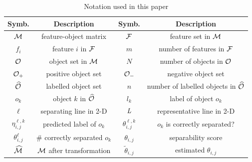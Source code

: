 \begin{table}[t!]
\centering
\small
\begin{tabular}{|c|c|c|c|}
 \hline
 Symb. & Description & Symb. & Description\\
 \hline
 \hline
 ${\mathcal{M}}$ & feature-object matrix & ${\mathcal{F}}$ & feature set in ${\mathcal{M}}$ \\
 \hline
 $f_i$ & feature $i$ in ${\mathcal{F}}$ & $m$ & number of features in ${\mathcal{F}}$\\
 \hline
 ${\mathcal{O}}$ & object set in ${\mathcal{M}}$ & $N$ & number of objects in ${\mathcal{O}}$\\
 \hline
 ${\mathcal{O}}_+$ & positive object set & ${\mathcal{O}}_-$ & negative object set\\
 \hline
 $\widehat{{\mathcal{O}}}$ & labelled object set & $n$ & number of labelled objects in $\widehat{{\mathcal{O}}}$\\
 \hline
 $o_k$ & object $k$ in $\widehat{{\mathcal{O}}}$ & $l_k$ & label of object $o_k$\\
 \hline
 $\ell$ & separating line in 2-D & $\mathit{L}$ & representative line in 2-D\\
 \hline
 $\eta_{i,j}^{\ell,k}$ & predicted label of $o_k$ & $\theta_{i,j}^{\ell,k}$ & $o_k$ is correctly separated? \\
 \hline
 $\theta_{i,j}^{\ell}$ & \# correctly separated $o_k$ & $\theta_{i,j}$ & separability score\\
 \hline
 $\widehat{{\mathcal{M}}}$ & ${\mathcal{M}}$ after transformation & $\tilde{\theta}_{i,j}$ & estimated $\theta_{i,j}$\\
 \hline
 \end{tabular}
\caption{Notation used in this paper}
\label{tbl:notation}
\vspace{-18pt}
\end{table}


